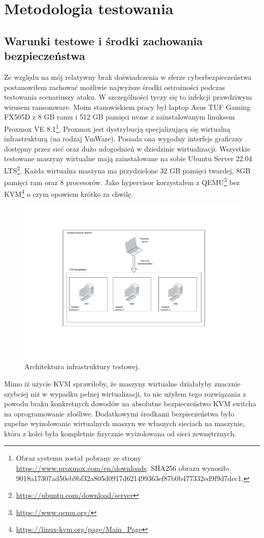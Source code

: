 \section{Metodologia testowania}
\subsection{Warunki testowe i środki zachowania bezpieczeństwa}
Ze względu na mój relatywny brak doświadczenia w sferze cyberbezpieczeństwa postanowiłem 
zachować możliwie najwyższe środki ostrożności podczas testowania scenariuszy ataku. W szczególności tyczy się to infekcji prawdziwym wirusem ransomware.\newline
Moim stanowiskiem pracy był laptop Asus TUF Gaming FX505D z 8 GB ramu i 512 GB pamięci nvme z zainstalowanym linuksem Proxmox VE 8.1\footnote{Obraz systemu został pobrany ze strony \url{https://www.proxmox.com/en/downloads}. SHA256 obrazu wynosiło 9018a17307ad50eb9bf32a805d0917d621499363ef87b0b477332ed9f9d7dcc1.}. Proxmox jest dystrybucją specjalizującą się wirtualną infrastrukturą (na rodzaj VmWare). Posiada ona wygodny interfejs graficzny dostępny przez sieć oraz dużo udogodnień w dziedzinie wirtualizacji.
\newline
Wszystkie testowane maszyny wirtualne mają zainstalowane na sobie Ubuntu Server 22.04 LTS\footnote{\url{https://ubuntu.com/download/server}}. Każda wirtualna maszyna ma przydzielone 32 GB pamięci twardej, 8GB pamięci ram oraz 8 procesorów. Jako hypervisor korzystałem z QEMU\footnote{\url{https://www.qemu.org/}} bez KVM\footnote{\url{https://linux-kvm.org/page/Main_Page}} o czym opowiem krótko za chwilę.
\begin{figure}[H]
    \centering
    \includegraphics[width=0.45\linewidth]{rysunki/test.drawio.pdf}
    \caption{Architektura infrastruktury testowej.}
    \label{fig:enter-label}
\end{figure}
Mimo iż użycie KVM sprawiłoby, że maszyny wirtualne działałyby znacznie szybciej niż w wypadku pełnej wirtualizacji, to nie użyłem tego rozwiązania z powodu braku konkretnych dowodów na absolutne bezpieczeństwo KVM switcha na oprogramowanie złośliwe. Dodatkowymi środkami bezpieczeństwa było zupełne wyizolowanie wirtualnych maszyn we własnych sieciach na maszynie, która z kolei była kompletnie fizycznie wyizolowana od sieci zewnętrznych.

